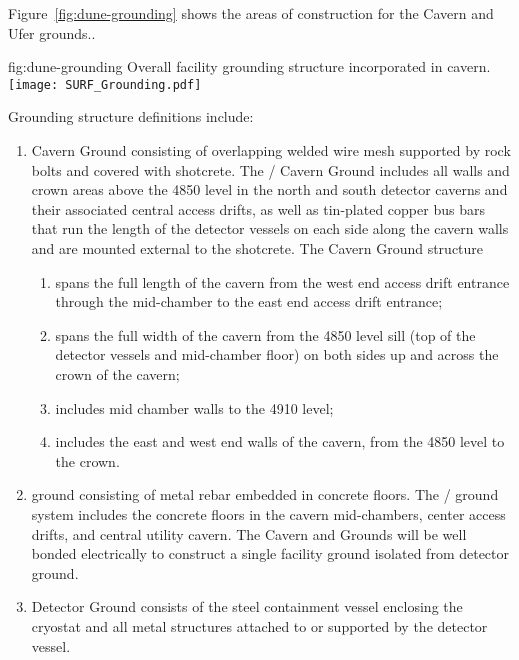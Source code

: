 Figure~\ref{fig:dune-grounding} shows the areas of construction for the Cavern and Ufer grounds..
\begin{dunefigure}{fig:dune-grounding}
  {Overall  facility grounding structure incorporated in cavern.}
  \texttt{[image: SURF\_Grounding.pdf]}
\end{dunefigure}
Grounding structure definitions include:
\begin{enumerate}
 \item Cavern Ground consisting of overlapping welded wire mesh
   supported by rock bolts and covered with shotcrete. The
   / Cavern Ground includes all walls and
   crown areas above the 4850 level in the north and south detector
   caverns and their associated central access drifts, as well as tin-plated
   copper bus bars that run the length of the detector vessels
   on each side along the cavern walls and are mounted external to the
   shotcrete.  The Cavern Ground structure
\begin{enumerate}
 \item spans the full length of the cavern from the west end access
   drift entrance through the mid-chamber to the east end access drift
   entrance;
 \item spans the full width of the cavern from the 4850 level sill
   (top of the detector vessels and mid-chamber floor) on both sides
   up and across the crown of the cavern;
 \item includes mid chamber walls to the 4910 level;
 \item includes the east and west end walls of the cavern, from the
   4850 level to the crown.
\end{enumerate}
 \item {} ground consisting of metal rebar embedded in
   concrete floors. The /  ground
   system includes the concrete floors in the cavern mid-chambers,
   center access drifts, and central utility cavern. The Cavern and
    Grounds will be well bonded electrically to construct
   a single facility ground isolated from detector ground.
 \item Detector Ground consists of the steel containment vessel
   enclosing the cryostat and all metal structures attached to or
   supported by the detector vessel.
\end{enumerate}


